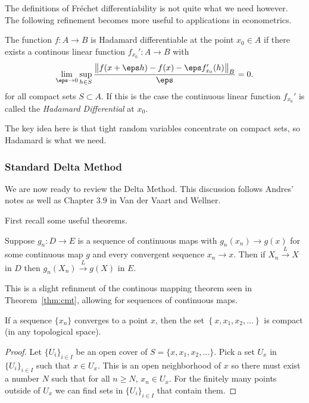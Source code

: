 The definitions of Fréchet differentiability is not quite what we need however. The following refinement becomes more useful to applications in econometrics.

\begin{definition}
	\label{def:hadamard}
	The function \(f:A\to B\) is Hadamard differentiable at the point \(x_0\in A\) if there exists a continous linear function \(f_{x_0}': A \to B\) with 
	\[
		\lim_{\eps\to 0}\sup_{h\in S} \frac{\left\|f(x+\eps h)-f(x)- \eps f_{x_0}'(h)\right\|_B}{\eps} =0
	.\]
	for all compact sets \(S\subset A\). If this is the case the continuous linear function \(f_{x_0}'\) is called the \textit{Hadamard Differential} at \(x_0\). 
\end{definition}

The key idea here is that tight random variables concentrate on compact sets, so Hadamard is what we need.

\subsubsection{Standard Delta Method}%
\label{subsubsec:standard-delta-method}

We are now ready to review the Delta Method. This discussion follows Andres' notes as well as Chapter 3.9 in Van der Vaart and Wellner. 

First recall some useful theorems.

\begin{theorem}
	\label{thm:cmt-2}
	Suppose \(g_n:D\to E\) is a sequence of continuous maps with \(g_n(x_n)\to g(x)\) for some continuous map \(g\) and every convergent sequence \(x_n \to x\). Then if \(X_n\overset{L}{\to} X\)	in \(D\) then  \(g_n(X_n)\overset{L}{\to} g(X )\) in \(E\).
\end{theorem}

This is a slight refinment of the continous mapping theorem seen in Theorem~\ref{thm:cmt}, allowing for sequences of continuous maps.
\begin{lemma}
	\label{lemma:convergent-compact}
	If a sequence \(\{x_n\}\) converges to a point \(x\), then the set  \( \left\{x,x_1,x_2,\dots\right\}\) is compact (in any topological space).
\end{lemma}
\begin{proof}
	Let \(\{U_i\}_{i\in I}\) be an open cover of \(S = \{x,x_1,x_2,\dots\} \). Pick a set \(U_x\) in  \(\{U_i\}_{i\in I}\) such that \(x\in U_x\). This is an open neighborhood of \(x\) so there must exist a number \(N\) such that for all \(n \geq N\), \(x_n \in U_x\). For the finitely many points outside of  \(U_x\) we can find sets in \(\{U_i\}_{i\in I}\) that contain them. 
\end{proof}

